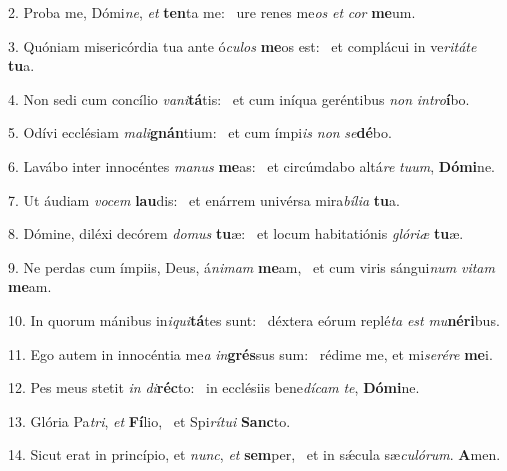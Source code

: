 2. Proba me, Dómi\textit{ne}, \textit{et} \textbf{ten}ta me: \ast\  ure renes me\textit{os} \textit{et} \textit{cor} \textbf{me}um.\

3. Quóniam misericórdia tua ante ó\textit{cu}\textit{los} \textbf{me}os est: \ast\  et complácui in ve\textit{ri}\textit{tá}\textit{te} \textbf{tu}a.\

4. Non sedi cum concílio \textit{va}\textit{ni}\textbf{tá}tis: \ast\  et cum iníqua geréntibus \textit{non} \textit{in}\textit{tro}\textbf{í}bo.\

5. Odívi ecclésiam \textit{ma}\textit{li}\textbf{gnán}tium: \ast\  et cum ímpi\textit{is} \textit{non} \textit{se}\textbf{dé}bo.\

6. Lavábo inter innocéntes \textit{ma}\textit{nus} \textbf{me}as: \ast\  et circúmdabo altá\textit{re} \textit{tu}\textit{um}, \textbf{Dó}\textbf{mi}ne.\

7. Ut áudiam \textit{vo}\textit{cem} \textbf{lau}dis: \ast\  et enárrem univérsa mira\textit{bí}\textit{li}\textit{a} \textbf{tu}a.\

8. Dómine, diléxi decórem \textit{do}\textit{mus} \textbf{tu}æ: \ast\  et locum habitatiónis \textit{gló}\textit{ri}\textit{æ} \textbf{tu}æ.\

9. Ne perdas cum ímpiis, Deus, á\textit{ni}\textit{mam} \textbf{me}am, \ast\  et cum viris sángui\textit{num} \textit{vi}\textit{tam} \textbf{me}am.\

10. In quorum mánibus in\textit{i}\textit{qui}\textbf{tá}tes sunt: \ast\  déxtera eórum replé\textit{ta} \textit{est} \textit{mu}\textbf{né}\textbf{ri}bus.\

11. Ego autem in innocéntia me\textit{a} \textit{in}\textbf{grés}sus sum: \ast\  rédime me, et mi\textit{se}\textit{ré}\textit{re} \textbf{me}i.\

12. Pes meus stetit \textit{in} \textit{di}\textbf{réc}to: \ast\  in ecclésiis bene\textit{dí}\textit{cam} \textit{te}, \textbf{Dó}\textbf{mi}ne.\

13. Glória Pa\textit{tri}, \textit{et} \textbf{Fí}lio, \ast\  et Spi\textit{rí}\textit{tu}\textit{i} \textbf{Sanc}to.\

14. Sicut erat in princípio, et \textit{nunc}, \textit{et} \textbf{sem}per, \ast\  et in sǽcula sæ\textit{cu}\textit{ló}\textit{rum}. \textbf{A}men.\


